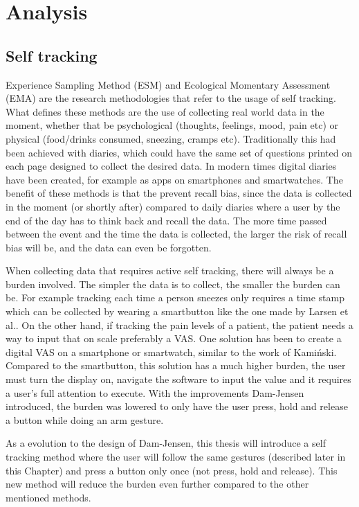 \chapter{Analysis}

\section{Self tracking}
Experience Sampling Method (ESM) and Ecological Momentary Assessment (EMA) are the research methodologies that refer to the usage of self tracking\cite{esm}. What defines these methods are the use of collecting real world data in the moment, whether that be psychological (thoughts, feelings, mood, pain etc) or physical (food/drinks consumed, sneezing, cramps etc). Traditionally this had been achieved with diaries, which could have the same set of questions printed on each page designed to collect the desired data. In modern times digital diaries have been created, for example as apps on smartphones and smartwatches. The benefit of these methods is that the prevent recall bias, since the data is collected in the moment (or shortly after) compared to daily diaries where a user by the end of the day has to think back and recall the data. The more time passed between the event and the time the data is collected, the larger the risk of recall bias will be, and the data can even be forgotten.

When collecting data that requires active self tracking, there will always be a burden involved. The simpler the data is to collect, the smaller the burden can be. For example tracking each time a person sneezes only requires a time stamp which can be collected by wearing a smartbutton like the one made by Larsen et al.\cite{eg}. On the other hand, if tracking the pain levels of a patient, the patient needs a way to input that on scale preferably a VAS. One solution has been to create a digital VAS on a smartphone or smartwatch, similar to the work of Kami\'nski\cite{tomas}. Compared to the smartbutton, this solution has a much higher burden, the user must turn the display on, navigate the software to input the value and it requires a user's full attention to execute. With the improvements Dam-Jensen\cite{dam} introduced, the burden was lowered to only have the user press, hold and release a button while doing an arm gesture.

As a evolution to the design of Dam-Jensen\cite{dam}, this thesis will introduce a self tracking method where the user will follow the same gestures (described later in this Chapter) and press a button only once (not press, hold and release). This new method will reduce the burden even further compared to the other mentioned methods.










